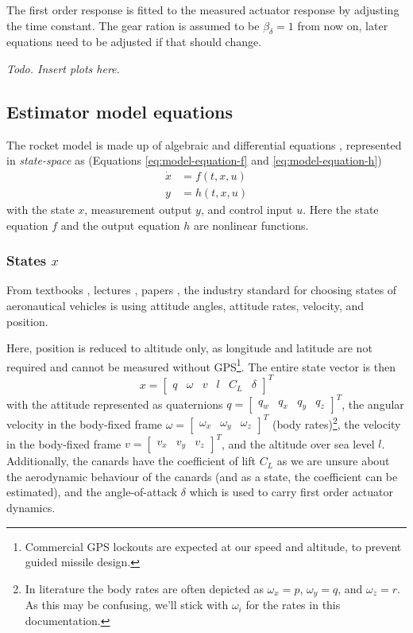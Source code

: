 The first order response is fitted to the measured actuator response by adjusting the time constant.
The gear ration is assumed to be $\beta_\delta = 1$ from now on, later equations need to be adjusted if that should change. 

\textit{Todo. Insert plots here.}


\subsection{Estimator model equations}
\label{sec:model_estimator}
The rocket model is made up of algebraic and differential equations \cite{zipfel2007, lewis2008, stevens2015}, represented in \textit{state-space} as \cite{lewis2008, stevens2015} (Equations \ref{eq:model-equation-f} and \ref{eq:model-equation-h})
\begin{align}
    \dot x &= f(t, x, u) \nonumber \\  y &= h(t, x, u) \nonumber
\end{align}  
with the state $x$, measurement output $y$, and control input $u$.
Here the state equation $f$ and the output equation $h$ are nonlinear functions.


\subsubsection{States $x$}
From textbooks \cite{zipfel2007, stevens2015, tewari2011},  lectures \cite{theis2023}, papers \cite{minh2012, theis2015}, the industry standard for choosing states of aeronautical vehicles is using attitude angles, attitude rates, velocity, and position. 

Here, position is reduced to altitude only, as longitude and latitude are not required and cannot be measured without GPS\footnote{Commercial GPS lockouts are expected at our speed and altitude, to prevent guided missile design.}. 
The entire state vector is then
\begin{equation}
    x =  \begin{bmatrix}
    q & \omega & v & l & C_L & \delta
    \end{bmatrix}^T
    \label{eq:model-state-vector}
\end{equation}
with the attitude represented as quaternions $q = \begin{bmatrix} q_w & q_x & q_y & q_z \end{bmatrix}^T$, the angular velocity in the body-fixed frame $\omega = \begin{bmatrix} \omega_x & \omega_y & \omega_z \end{bmatrix}^T$ (body rates)\footnote{In literature the body rates are often depicted as $\omega_x = p$, $\omega_y = q$, and $\omega_z = r$. As this may be confusing, we'll stick with $\omega_i$ for the rates in this documentation.}, the velocity in the body-fixed frame $v = \begin{bmatrix} v_x & v_y & v_z \end{bmatrix}^T$, and the altitude over sea level $l$. 
Additionally, the canards have the coefficient of lift $C_L$ as we are unsure about the aerodynamic behaviour of the canards (and as a state, the coefficient can be estimated), and the angle-of-attack $\delta$ which is used to carry first order actuator dynamics.

